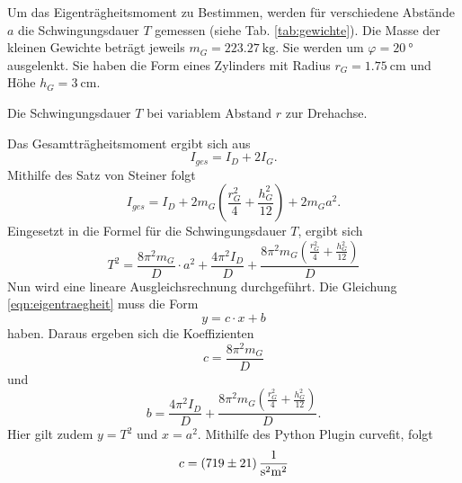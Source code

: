 Um das Eigenträgheitsmoment zu Bestimmen, werden für verschiedene Abstände $a$ die Schwingungsdauer $T$ gemessen (siehe Tab. \ref{tab:gewichte}).
Die Masse der kleinen Gewichte beträgt jeweils $m_G = \SI{223,27}{\kg}$.
Sie werden um $\varphi = \SI{20}{\degree}$ ausgelenkt.
Sie haben die Form eines Zylinders mit Radius $r_G=\SI{1,75}{\centi\metre}$ und Höhe $h_G=\SI{3}{\centi\metre}$.
\begin{table}
    \centering
    \caption{Die Schwingungsdauer $T$ bei variablem Abstand $r$ zur Drehachse.}
    \label{tab:gewichte}  
\end{table}
\FloatBarrier
Das Gesamtträgheitsmoment ergibt sich aus
\begin{equation*}
    I_{ges} = I_D + 2 I_G .
\end{equation*}
Mithilfe des Satz von Steiner folgt %
\begin{equation*}
    I_{ges} = I_D + 2 m_G \left ( \frac{r^2_G}{4} + \frac{h^2_G}{12} \right) + 2 m_G a^2 .
\end{equation*}
Eingesetzt in die Formel für die Schwingungsdauer $T$, ergibt sich %
\begin{equation}
    T^2 = \frac{8 \pi^2 m_G}{D} \cdot a^2 + \frac{4 \pi^2 I_D}{D} + \frac{8 \pi^2 m_G \left (\frac{r^2_G}{4} + \frac{h^2_G}{12} \right )}{D}
    \label{eqn:eigentraegheit}
\end{equation}
Nun wird eine lineare Ausgleichsrechnung durchgeführt.
Die Gleichung \ref{eqn:eigentraegheit} muss die Form
\begin{equation*}
    y = c \cdot x + b 
\end{equation*}
haben.
Daraus ergeben sich die Koeffizienten
\begin{equation*}
    c = \frac{8\pi^2m_G}{D}
\end{equation*}
und
\begin{equation}
    b = \frac{4 \pi^2 I_D}{D} + \frac{8 \pi^2 m_G \left (\frac{r^2_G}{4} + \frac{h^2_G}{12} \right )}{D}.
    \label{eqn:b}
\end{equation}
Hier gilt zudem $y = T^2$ und $x = a^2$.
Mithilfe des Python Plugin curvefit, folgt %
\begin{equation*}
    c = \SI{719(21)}{\frac{1}{\second^2 \metre^2}}
\end{equation*}
